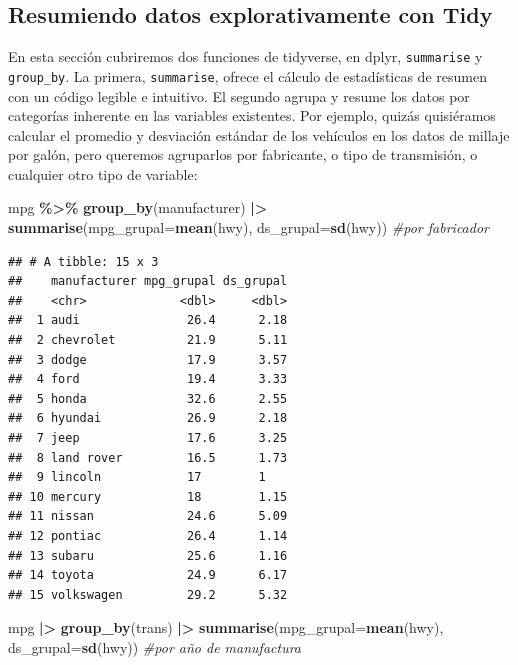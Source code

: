 \documentclass[
]{article}
\newenvironment{Shaded}{\begin{snugshade}}{\end{snugshade}}
\newcommand{\AttributeTok}[1]{\textcolor[rgb]{0.13,0.29,0.53}{#1}}
\newcommand{\CommentTok}[1]{\textcolor[rgb]{0.56,0.35,0.01}{\textit{#1}}}
\newcommand{\FunctionTok}[1]{\textcolor[rgb]{0.13,0.29,0.53}{\textbf{#1}}}
\newcommand{\NormalTok}[1]{#1}
\newcommand{\SpecialCharTok}[1]{\textcolor[rgb]{0.81,0.36,0.00}{\textbf{#1}}}
\begin{document}
\subsection{Resumiendo datos explorativamente con
Tidy}\label{resumiendo-datos-explorativamente-con-tidy}

En esta sección cubriremos dos funciones de tidyverse, en dplyr,
\texttt{summarise} y \texttt{group\_by}. La primera, \texttt{summarise},
ofrece el cálculo de estadísticas de resumen con un código legible e
intuitivo. El segundo agrupa y resume los datos por categorías inherente
en las variables existentes. Por ejemplo, quizás quisiéramos calcular el
promedio y desviación estándar de los vehículos en los datos de millaje
por galón, pero queremos agruparlos por fabricante, o tipo de
transmisión, o cualquier otro tipo de variable:

\begin{Shaded}
\begin{Highlighting}[]
\NormalTok{mpg }\SpecialCharTok{\%\textgreater{}\%}
  \FunctionTok{group\_by}\NormalTok{(manufacturer) }\SpecialCharTok{|\textgreater{}}
  \FunctionTok{summarise}\NormalTok{(}\AttributeTok{mpg\_grupal=}\FunctionTok{mean}\NormalTok{(hwy),}
            \AttributeTok{ds\_grupal=}\FunctionTok{sd}\NormalTok{(hwy)) }\CommentTok{\#por fabricador}
\end{Highlighting}
\end{Shaded}

\begin{verbatim}
## # A tibble: 15 x 3
##    manufacturer mpg_grupal ds_grupal
##    <chr>             <dbl>     <dbl>
##  1 audi               26.4      2.18
##  2 chevrolet          21.9      5.11
##  3 dodge              17.9      3.57
##  4 ford               19.4      3.33
##  5 honda              32.6      2.55
##  6 hyundai            26.9      2.18
##  7 jeep               17.6      3.25
##  8 land rover         16.5      1.73
##  9 lincoln            17        1   
## 10 mercury            18        1.15
## 11 nissan             24.6      5.09
## 12 pontiac            26.4      1.14
## 13 subaru             25.6      1.16
## 14 toyota             24.9      6.17
## 15 volkswagen         29.2      5.32
\end{verbatim}

\begin{Shaded}
\begin{Highlighting}[]
\NormalTok{mpg }\SpecialCharTok{|\textgreater{}}
  \FunctionTok{group\_by}\NormalTok{(trans) }\SpecialCharTok{|\textgreater{}}
  \FunctionTok{summarise}\NormalTok{(}\AttributeTok{mpg\_grupal=}\FunctionTok{mean}\NormalTok{(hwy),}
            \AttributeTok{ds\_grupal=}\FunctionTok{sd}\NormalTok{(hwy)) }\CommentTok{\#por año de manufactura}
\end{Highlighting}
\end{Shaded}
\end{document}
